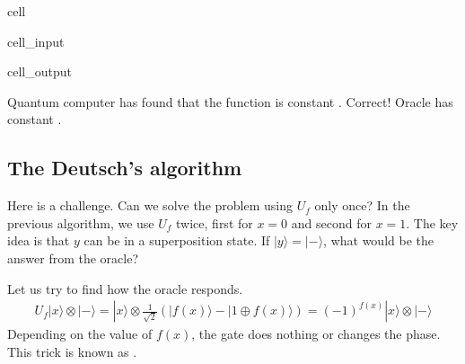 \documentclass[letterpaper,10pt,english]{jupyterBook}
\begin{document}
\begin{sphinxuseclass}{cell}
\begin{sphinxVerbatimInput}
\begin{sphinxuseclass}{cell_input}
\begin{sphinxVerbatim}[commandchars=\\\{\}]
 
\end{sphinxVerbatim}

\end{sphinxuseclass}\end{sphinxVerbatimInput}
\begin{sphinxVerbatimOutput}

\begin{sphinxuseclass}{cell_output}
\begin{sphinxVerbatim}[commandchars=\\\{\}]
Quantum computer has found that the function is constant .
Correct! Oracle has constant .
\end{sphinxVerbatim}

\end{sphinxuseclass}\end{sphinxVerbatimOutput}

\end{sphinxuseclass}

\subsection{The Deutsch’s algorithm}
\label{\detokenize{algorithms/deutsch:the-deutsch-s-algorithm}}
\sphinxAtStartPar
Here is a challenge.  Can we solve the problem using \(U_f\) only once? In the previous algorithm, we use \(U_f\) twice, first for \(x=0\) and second for \(x=1\).  The key idea is that \(y\) can be in a superposition state.  If \(|y\rangle = |-\rangle\), what would be the answer from the oracle?

\sphinxAtStartPar
Let us try to find how the oracle responds.
\begin{equation*}
\begin{split}
U_f |x\rangle \otimes |-\rangle = |x \rangle \otimes \frac{1}{\sqrt{2}} \left( |f(x)\rangle - |1\oplus f(x)\rangle\right) = (-1)^{f(x)} |x\rangle \otimes |-\rangle
\end{split}
\end{equation*}
\sphinxAtStartPar
Depending on the value of \(f(x)\), the gate does nothing or changes the phase.  This trick is known as .
\end{document}
